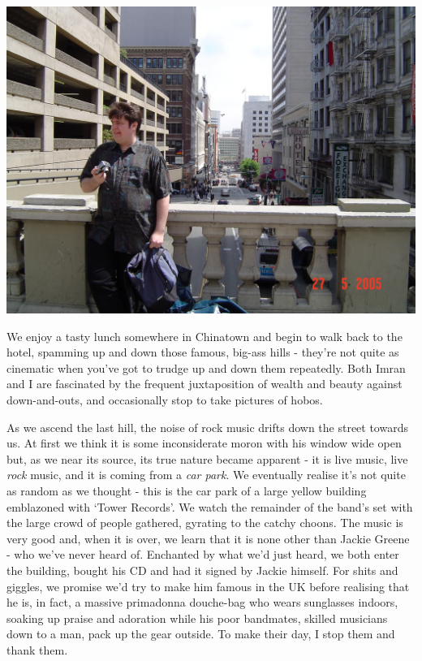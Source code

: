 \documentclass[a5paper,titlepage,11pt]{book}
\begin{document}
\begin{center}\includegraphics[width=\textwidth]{gfx/DSC00625}\end{center}

We enjoy a tasty lunch somewhere in Chinatown and begin to walk back to the hotel, spamming up and down those famous, big-ass hills - they're not quite as cinematic when you've got to trudge up and down them repeatedly.  Both Imran and I are fascinated by the frequent juxtaposition of wealth and beauty against down-and-outs, and occasionally stop to take pictures of hobos.

As we ascend the last hill, the noise of rock music drifts down the street towards us.  At first we think it is some inconsiderate moron with his window wide open but, as we near its source, its true nature became apparent - it is live music, live \emph{rock} music, and it is coming from a \emph{car park}.  We eventually realise it's not quite as random as we thought - this is the car park of a large yellow building emblazoned with `Tower Records'.  We watch the remainder of the band's set with the large crowd of people gathered, gyrating to the catchy choons.  The music is very good and, when it is over, we learn that it is none other than Jackie Greene - who we've never heard of.  Enchanted by what we'd just heard, we both enter the building, bought his CD and had it signed by Jackie himself.  For shits and giggles, we promise we'd try to make him famous in the UK before realising that he is, in fact, a massive primadonna douche-bag who wears sunglasses indoors, soaking up praise and adoration while his poor bandmates, skilled musicians down to a man, pack up the gear outside.  To make their day, I stop them and thank them.
\end{document}
